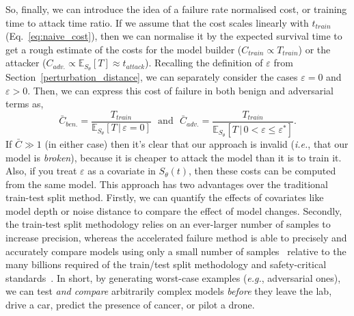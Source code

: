 So, finally, we can introduce the idea of a failure rate normalised cost, or training time to attack time ratio. If we assume that the cost scales linearly with $t_{train}$ (Eq.~\ref{eq:naive_cost}), then we can normalise it by the expected survival time to get a rough estimate of the costs for the model builder ($C_{train} \propto T_{train}$) or the attacker ($C_{adv.} \propto \mathbb{E}_{S_\theta}[T] \approx t_{attack}$). Recalling the definition of $\varepsilon$ from Section~\ref{perturbation_distance}, we can separately consider the cases $\varepsilon=0$ and $\varepsilon > 0$. Then, we can express this cost of failure in both benign and adversarial terms as,
\begin{equation}
	\bar{C}_{ben.} = \frac{T_{train}}{\mathbb{E}_{S_\theta}[T \,|\, \varepsilon = 0] }
	\text{~~and~~}
	\bar{C}_{adv.}=\frac{T_{train}}{\mathbb{E}_{S_\theta}[T \,|\, 0 < \varepsilon \leq \varepsilon^*]}.
	\label{eq:cost}
\end{equation}
If $\bar{C} \gg 1$ (in either case) then it's clear that our approach is invalid (\textit{i.e.}, that our model is \textit{broken}), because it is cheaper to attack the model than it is to train it. Also, if you treat $\varepsilon$ as a covariate in ${S_\theta}(t)$, then these costs can be computed from the same model.
This approach has two advantages over the traditional train-test split method. Firstly, we can quantify the effects of covariates like model depth or noise distance to compare the effect of model changes. Secondly, the train-test split methodology relies on an ever-larger number of samples to increase precision, whereas the accelerated failure method is able to precisely and accurately compare models using only a small number of samples~\cite{schmoor2000sample,lachin1981introduction} relative to the many billions required of the train/test split methodology and safety-critical standards~\cite{iso26262,IEC61508,IEC62034,meyers}. 
In short, by generating worst-case examples (\textit{e.g.}, adversarial ones), we can test \textit{and compare} arbitrarily complex models \textit{before} they leave the lab, drive a car, predict the presence of cancer, or pilot a drone. 